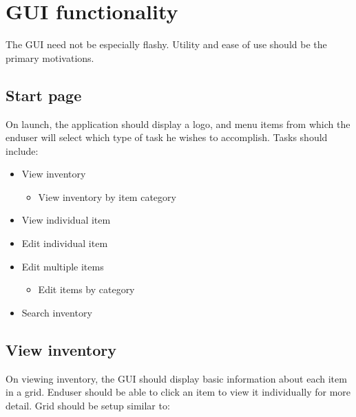 \documentclass[titlepage]{article}
\begin{document}
    \section{GUI functionality}
        The GUI need not be especially flashy. Utility and ease of use should be the primary
        motivations.

        \subsection{Start page}
            On launch, the application should display a logo, and menu items from which the
            enduser will select which type of task he wishes to accomplish. Tasks should include:

            \begin{itemize}
                \item
                View inventory
                    \begin{itemize}
                        \item
                        View inventory by item category
                    \end{itemize}

                \item
                View individual item

                \item
                Edit individual item

                \item
                Edit multiple items
                    \begin{itemize}
                        \item
                        Edit items by category
                    \end{itemize}

                \item
                Search inventory
            \end{itemize}

        \subsection{View inventory}
            On viewing inventory, the GUI should display basic information about each item
            in a grid. Enduser should be able to click an item to view it individually for
            more detail. Grid should be setup similar to:
\end{document}
